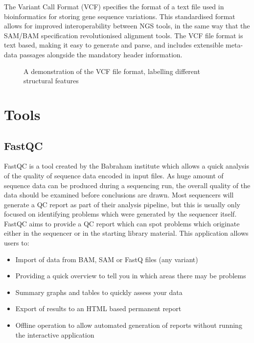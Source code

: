 \documentclass[12pt]{report}
\begin{document}
The Variant Call Format (VCF) specifies the format of a text file used in bioinformatics for storing gene sequence variations. This standardised format allows for improved interoperability between NGS tools, in the same way that the SAM/BAM specification revolutionised alignment tools. The VCF file format is text based, making it easy to generate and parse, and includes extensible meta-data passages alongside the mandatory header information. 

\begin{figure}[ht]
	\centering
	\caption{A demonstration of the VCF file format, labelling different structural features}\label{VCF}
\end{figure}

\chapter*{Tools}

\section*{FastQC}

FastQC is a tool created by the Babraham institute which allows a quick analysis of the quality of sequence data encoded in input files. As huge amount of sequence data can be produced during a sequencing run, the overall quality of the data should be examined before conclusions are drawn. Most sequencers will generate a QC report as part of their analysis pipeline, but this is usually only focused on identifying problems which were generated by the sequencer itself. FastQC aims to provide a QC report which can spot problems which originate either in the sequencer or in the starting library material. This application allows users to:
\begin{itemize}
	\item Import of data from BAM, SAM or FastQ files (any variant)
	\item Providing a quick overview to tell you in which areas there may be problems
	\item Summary graphs and tables to quickly assess your data
	\item Export of results to an HTML based permanent report
	\item Offline operation to allow automated generation of reports without running the interactive application	
\end{itemize}
\end{document}
